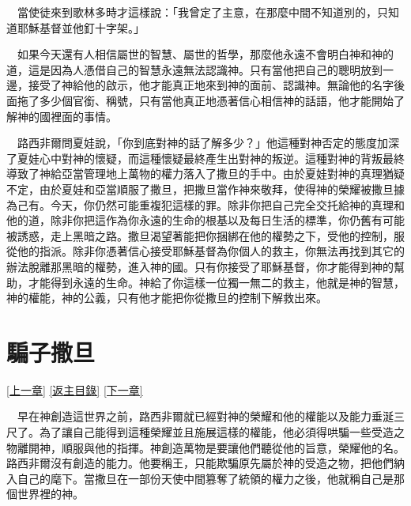 \documentclass{book}
\begin{document}
　當使徒來到歌林多時才這樣說：「我曾定了主意，在那麼中間不知道別的，只知道耶穌基督並他釘十字架。」

　如果今天還有人相信屬世的智慧、屬世的哲學，那麼他永遠不會明白神和神的道，這是因為人憑借自己的智慧永遠無法認識神。只有當他把自己的聰明放到一邊，接受了神給他的啟示，他才能真正地來到神的面前、認識神。無論他的名字後面拖了多少個官銜、稱號，只有當他真正地憑著信心相信神的話語，他才能開始了解神的國裡面的事情。

　路西非爾問夏娃說，「你到底對神的話了解多少？」他這種對神否定的態度加深了夏娃心中對神的懷疑，而這種懷疑最終產生出對神的叛逆。這種對神的背叛最終導致了神給亞當管理地上萬物的權力落入了撒旦的手中。由於夏娃對神的真理猶疑不定，由於夏娃和亞當順服了撒旦，把撒旦當作神來敬拜，使得神的榮耀被撒旦據為己有。今天，你仍然可能重複犯這樣的罪。除非你把自己完全交托給神的真理和他的道，除非你把這作為你永遠的生命的根基以及每日生活的標準，你仍舊有可能被誘惑，走上黑暗之路。撒旦渴望著能把你捆綁在他的權勢之下，受他的控制，服從他的指派。除非你憑著信心接受耶穌基督為你個人的救主，你無法再找到其它的辦法脫離那黑暗的權勢，進入神的國。只有你接受了耶穌基督，你才能得到神的幫助，才能得到永遠的生命。神給了你這樣一位獨一無二的救主，他就是神的智慧，神的權能，神的公義，只有他才能把你從撒旦的控制下解救出來。

\chapter{騙子撒旦}
\label{sec:ch05}
\hyperref[sec:ch04]{[上一章]}
\hyperlink{toc}{[返主目錄]}
\hyperref[sec:ch06]{[下一章]}

\begin{center}
\noindent{}
\end{center}

　早在神創造這世界之前，路西非爾就已經對神的榮耀和他的權能以及能力垂涎三尺了。為了讓自己能得到這種榮耀並且施展這樣的權能，他必須得哄騙一些受造之物離開神，順服與他的指揮。神創造萬物是要讓他們聽從他的旨意，榮耀他的名。路西非爾沒有創造的能力。他要稱王，只能欺騙原先屬於神的受造之物，把他們納入自己的麾下。當撒旦在一部份天使中間篡奪了統領的權力之後，他就稱自己是那個世界裡的神。
\end{document}
